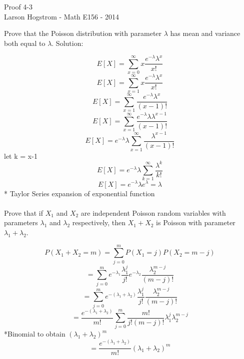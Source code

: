 \documentclass[12pt]{article}
\begin{document}
\begin{center}
Proof 4-3 \\
Larson Hogstrom - Math E156 - 2014
\end{center}





Prove that the Poisson distribution with parameter $\lambda$ has mean and variance both equal to $\lambda$. 
Solution:

$$ E[X] = \sum_{x=0}^{\infty}  x \frac{e^{-\lambda}\lambda^x}{x!} $$
$$ E[X] = \sum_{x=1}^{\infty}  x \frac{e^{-\lambda}\lambda^x}{x!} $$
$$ E[X] = \sum_{x=1}^{\infty}  \frac{e^{-\lambda}\lambda^x}{(x-1)!} $$
$$ E[X] = \sum_{x=1}^{\infty}  \frac{e^{-\lambda}\lambda\lambda^{x-1}}{(x-1)!} $$
$$ E[X] = e^{-\lambda}\lambda \sum_{x=1}^{\infty}  \frac{\lambda^{x-1}}{(x-1)!} $$
let k = x-1
$$ E[X] = e^{-\lambda}\lambda \sum_{k=1}^{\infty}  \frac{\lambda^k}{k!} $$
$$ E[X] = e^{-\lambda}\lambda e^\lambda = \lambda$$
* Taylor Series expansion of exponential function

\pagebreak

\paragraph*{}
Prove that if $X_1$ and $X_2$ are independent Poisson random variables with parameters $\lambda_1$ and $\lambda_2$ respectively, then $X_1 + X_2$ is Poisson with parameter $\lambda_1 + \lambda_2$.


$$ P(X_1 + X_2 = m) = \sum_{j=0}^m P(X_1 = j)P(X_2 = m-j) $$
$$ = \sum_{j=0}^m e^{-\lambda_1}\frac{\lambda_1^j}{j!}  e^{-\lambda_2}  \frac{\lambda_2^{m-j}}{(m-j)!} $$
$$ = \sum_{j=0}^m  e^{-(\lambda_1 + \lambda_2)} \frac{\lambda_1^j}{j!}    \frac{\lambda_2^{m-j}}{(m-j)!} $$
$$ = \frac{e^{-(\lambda_1 + \lambda_2)}}{m!} \sum_{j=0}^m  \frac{m!}{j!(m-j)!} \lambda_1^j \lambda_2^{m-j}$$ 
*Binomial to obtain $( \lambda_1 + \lambda_2 )^m $
$$ = \frac{e^{-(\lambda_1 + \lambda_2)}}{m!} ( \lambda_1 + \lambda_2 )^m $$
\end{document}
